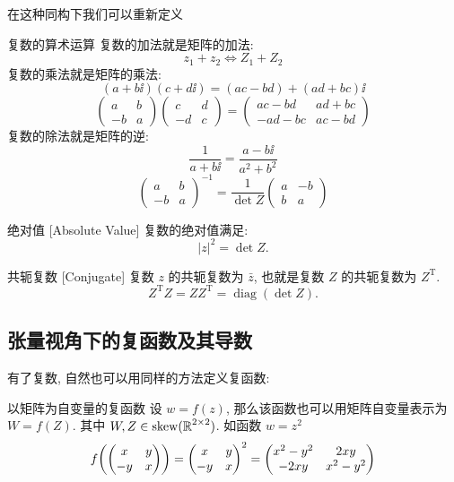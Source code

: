         在这种同构下我们可以重新定义

        \begin{dfn}
            {复数的算术运算}
            复数的加法就是矩阵的加法: 
            \[z_1+z_2\Longleftrightarrow Z_1+Z_2\]
            复数的乘法就是矩阵的乘法: 
            \[(a+b\ii)(c+d\ii)=(ac-bd)+(ad+bc)\ii\]
            \[\begin{pmatrix}
                a&b\\-b&a
            \end{pmatrix}\begin{pmatrix}
                c&d\\-d&c
            \end{pmatrix}=\begin{pmatrix}
                ac-bd&ad+bc\\-ad-bc&ac-bd
            \end{pmatrix}\]
            复数的除法就是矩阵的逆: 
            \[\frac{1}{a+b\ii}=\frac{a-b\ii}{a^2+b^2}\]
            \[\begin{pmatrix}
                a&b\\-b&a
            \end{pmatrix}^{-1}=\frac{1}{\det Z}\begin{pmatrix}
                a&-b\\b&a
            \end{pmatrix}\]
        \end{dfn}

        \begin{dfn}
            {绝对值}
            [Absolute Value]
            复数的绝对值满足: 
            \[|z|^2=\det Z.\]
        \end{dfn}

        \begin{dfn}
            {共轭复数}
            [Conjugate]
            复数 \(z\) 的共轭复数为 \(\bar{z}\), 也就是复数 \(Z\) 的共轭复数为 \(Z^{\mathrm{T}}\).
            \[Z^{\mathrm{T}}Z=ZZ^{\mathrm{T}}=\operatorname{diag}(\det Z).\]
        \end{dfn}
    
    \subsection{张量视角下的复函数及其导数}

        有了复数, 自然也可以用同样的方法定义复函数: 

        \begin{xmp}
            {以矩阵为自变量的复函数}
            设 \(w=f(z)\), 那么该函数也可以用矩阵自变量表示为 \(W=f(Z)\). 其中 \(W,Z\in\operatorname{skew}(\operatorname{\mathbb{R}}^{2\times 2})\). 如函数 \(w=z^2\) 
            \[f\pqty{\mqty(x & y\\-y & x)}=\mqty(x & y\\-y & x)^2=\mqty(x^2-y^2 & 2xy \\ -2xy & x^2-y^2)\]
        \end{xmp}

